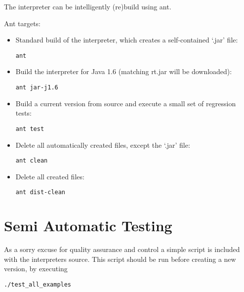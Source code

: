 The interpreter can be intelligently (re)build using ant.

Ant targets:

\begin{itemize}
	\item Standard build of the interpreter, which creates a self-contained `.jar' file:
\begin{lstlisting}[frame=none,numbers=none]
ant
\end{lstlisting}

	\item Build the interpreter for Java 1.6 (matching rt.jar will be downloaded):

\begin{lstlisting}[frame=none,numbers=none]
ant jar-j1.6
\end{lstlisting}

	\item Build a current version from source and execute a small set of regression tests:

\begin{lstlisting}[frame=none,numbers=none]
ant test
\end{lstlisting}

	\item Delete all automatically created files, except the `.jar' file:

\begin{lstlisting}[frame=none,numbers=none]
ant clean
\end{lstlisting}

	\item Delete all created files:

\begin{lstlisting}[frame=none,numbers=none]
ant dist-clean
\end{lstlisting}

\end{itemize}

\section{Semi Automatic Testing}\label{testing}

As a sorry excuse for quality assurance and control a simple  script is included with the interpreters source.
This script should be run before creating a new version, by executing

\begin{lstlisting}[frame=none,numbers=none]
./test_all_examples
\end{lstlisting}


